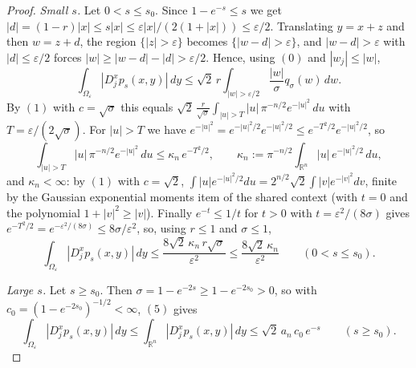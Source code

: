 \begin{proof}
\emph{Small $s$.}  Let $0 < s \leq s_0$.  Since $1-e^{-s} \leq s$ we get
$|d| = (1-r)|x| \leq s|x| \leq \varepsilon|x|/(2(1+|x|)) \leq \varepsilon/2$.
Translating $y = x+z$ and then $w = z+d$, the region
$\{|z| > \varepsilon\}$ becomes $\{|w-d| > \varepsilon\}$, and
$|w-d| > \varepsilon$ with $|d| \leq \varepsilon/2$ forces
$|w| \geq |w-d| - |d| > \varepsilon/2$.  Hence, using $(0)$ and
$|w_j| \leq |w|$,
\[
  \int_{\Omega_\varepsilon}|D_j^xp_s(x,y)|\,dy
    \leq \sqrt2\,r\int_{|w|>\varepsilon/2}\frac{|w|}{\sigma}q_\sigma(w)\,dw .
\]
By $(1)$ with $c = \sqrt\sigma$ this equals
$\sqrt2\,\frac{r}{\sqrt\sigma}\int_{|u|>T}|u|\,\pi^{-n/2}e^{-|u|^2}\,du$ with
$T = \varepsilon/(2\sqrt\sigma)$.  For $|u| > T$ we have
$e^{-|u|^2} = e^{-|u|^2/2}e^{-|u|^2/2} \leq e^{-T^2/2}e^{-|u|^2/2}$, so
\[
  \int_{|u|>T}|u|\,\pi^{-n/2}e^{-|u|^2}\,du \leq \kappa_n\,e^{-T^2/2},
  \qquad
  \kappa_n := \pi^{-n/2}\int_{\mathbb{R}^n}|u|\,e^{-|u|^2/2}\,du ,
\]
and $\kappa_n < \infty$: by $(1)$ with $c = \sqrt2$,
$\int |u|e^{-|u|^2/2}du = 2^{n/2}\sqrt2\int|v|e^{-|v|^2}dv$, finite by the
Gaussian exponential moments item of the shared context (with $t=0$ and the
polynomial $1+|v|^2 \geq |v|$).  Finally $e^{-t} \leq 1/t$ for $t > 0$ with
$t = \varepsilon^2/(8\sigma)$ gives
$e^{-T^2/2} = e^{-\varepsilon^2/(8\sigma)} \leq 8\sigma/\varepsilon^2$, so,
using $r \leq 1$ and $\sigma \leq 1$,
\begin{equation*}
  \int_{\Omega_\varepsilon}|D_j^xp_s(x,y)|\,dy
    \leq \frac{8\sqrt2\,\kappa_n\,r\sqrt\sigma}{\varepsilon^2}
    \leq \frac{8\sqrt2\,\kappa_n}{\varepsilon^2}
  \qquad (0 < s \leq s_0) . \tag{12}
\end{equation*}

\emph{Large $s$.}  Let $s \geq s_0$.  Then
$\sigma = 1-e^{-2s} \geq 1-e^{-2s_0} > 0$, so with
$c_0 = (1-e^{-2s_0})^{-1/2} < \infty$, $(5)$ gives
\begin{equation*}
  \int_{\Omega_\varepsilon}|D_j^xp_s(x,y)|\,dy
    \leq \int_{\mathbb{R}^n}|D_j^xp_s(x,y)|\,dy
    \leq \sqrt2\,a_n\,c_0\,e^{-s}
  \qquad (s \geq s_0) . \tag{13}
\end{equation*}


\end{proof}
